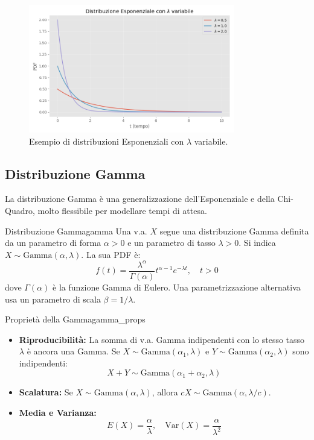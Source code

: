 \begin{figure}[H]
    \centering
    \includegraphics[width=0.8\textwidth]{images/esponenziale.png}
    \caption{Esempio di distribuzioni Esponenziali con \(\lambda\) variabile.}
    \label{fig:esponenziale}
\end{figure}

\subsection{Distribuzione Gamma}
La distribuzione Gamma è una generalizzazione dell'Esponenziale e della Chi-Quadro, molto flessibile per modellare tempi di attesa.

\begin{definizione}{Distribuzione Gamma}{gamma}
Una v.a. \(X\) segue una distribuzione Gamma definita da un parametro di forma \(\alpha>0\) e un parametro di tasso \(\lambda>0\). Si indica \(X \sim \text{Gamma}(\alpha, \lambda)\). La sua PDF è:
\[
f(t) = \frac{\lambda^\alpha}{\Gamma(\alpha)} t^{\alpha-1} e^{-\lambda t}, \quad t>0
\]
dove \(\Gamma(\alpha)\) è la funzione Gamma di Eulero. Una parametrizzazione alternativa usa un parametro di scala \(\beta = 1/\lambda\).
\end{definizione}

\begin{proposizione}{Proprietà della Gamma}{gamma_props}
\begin{itemize}
    \item \textbf{Riproducibilità:} La somma di v.a. Gamma indipendenti con lo stesso tasso \(\lambda\) è ancora una Gamma. Se \(X \sim \text{Gamma}(\alpha_1, \lambda)\) e \(Y \sim \text{Gamma}(\alpha_2, \lambda)\) sono indipendenti:
    \[ X+Y \sim \text{Gamma}(\alpha_1+\alpha_2, \lambda) \]
    \item \textbf{Scalatura:} Se \(X \sim \text{Gamma}(\alpha, \lambda)\), allora \(cX \sim \text{Gamma}(\alpha, \lambda/c)\).
    \item \textbf{Media e Varianza:}
    \[ E(X) = \frac{\alpha}{\lambda}, \quad \text{Var}(X) = \frac{\alpha}{\lambda^2} \]
\end{itemize}
\end{proposizione}

